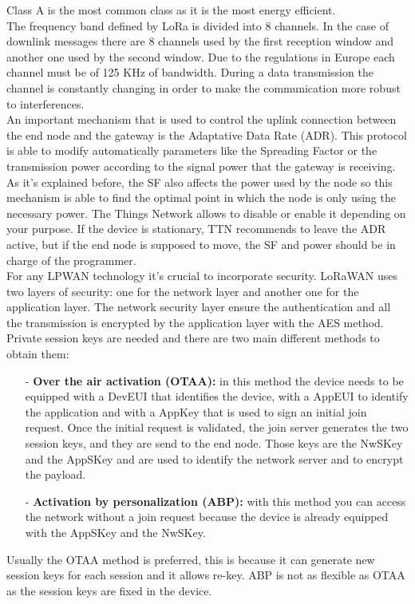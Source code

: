 Class A is the most common class as it is the most energy efficient.\\
The frequency band defined by LoRa is divided into 8 channels. In the
case of downlink messages there are 8 channels used by the first
reception window and another one used by the second window. Due to
the regulations in Europe each channel must be of 125 KHz of
bandwidth. During a data transmission the channel is constantly
changing in order to make the communication more robust to
interferences.\\
An important mechanism that is used to control the uplink connection
between the end node and the gateway is the Adaptative Data Rate
(ADR). This protocol is able to modify automatically parameters like the
Spreading Factor or the transmission power according to the signal
power that the gateway is receiving. As it's explained before, the SF also
affects the power used by the node so this mechanism is able to find the
optimal point in which the node is only using the necessary power. The
Things Network allows to disable or enable it depending on your
purpose. If the device is stationary, TTN recommends to leave the ADR
active, but if the end node is supposed to move, the SF and power
should be in charge of the programmer.\\
For any LPWAN technology it's crucial to incorporate security.
LoRaWAN uses two layers of security: one for the network layer and
another one for the application layer. The network security layer ensure
the authentication and all the transmission is encrypted by the
application layer with the AES method. Private session keys are needed
and there are two main different methods to obtain them:
\begin{itemize}
    \item[-] {\bfseries Over the air activation (OTAA):} in this method the device needs
to be equipped with a DevEUI that identifies the device, with a
AppEUI to identify the application and with a AppKey that is used
to sign an initial join request. Once the initial request is validated,
the join server generates the two session keys, and they are send
to the end node. Those keys are the NwSKey and the AppSKey
and are used to identify the network server and to encrypt the
payload.
    \item[-] {\bfseries Activation by personalization (ABP):} with this method you can
access the network without a join request because the device is
already equipped with the AppSKey and the NwSKey.
\end{itemize}
Usually the OTAA method is preferred, this is because it can generate
new session keys for each session and it allows re-key. ABP is not as
flexible as OTAA as the session keys are fixed in the device.
